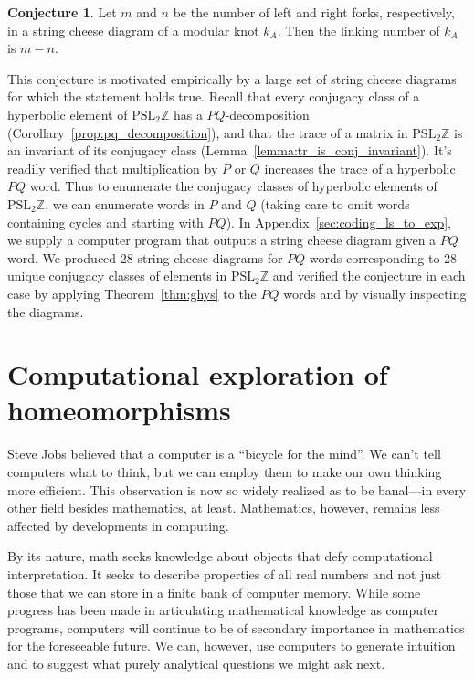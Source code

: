 \documentclass[12pt,twoside]{reedthesis}
\theoremstyle{definition}
\newtheorem{conj}[thm]{Conjecture}
\newcommand{\Z}{\mathbb{Z}}
\newcommand{\PSLZ}{\mathrm{PSL}_2{\Z}}
\begin{document}
\begin{conj}
  Let $m$ and $n$ be the number of left and right forks, respectively, in a string cheese diagram of a modular knot $k_A$.
  Then the linking number of $k_A$ is $m - n$.
\end{conj}

This conjecture is motivated empirically by a large set of string cheese diagrams for which the statement holds true.
Recall that every conjugacy class of a hyperbolic element of $\PSLZ$ has a $PQ$-decomposition (Corollary~\ref{prop:pq_decomposition}), and that the trace of a matrix in $\PSLZ$ is an invariant of its conjugacy class (Lemma~\ref{lemma:tr_is_conj_invariant}).
It's readily verified that multiplication by $P$ or $Q$ increases the trace of a hyperbolic $PQ$ word.
Thus to enumerate the conjugacy classes of hyperbolic elements of $\PSLZ$, we can enumerate words in $P$ and $Q$ (taking care to omit words containing cycles and starting with $PQ$).
In Appendix~\ref{sec:coding_ls_to_exp}, we supply a computer program that outputs a string cheese diagram given a $PQ$ word.
We produced 28 string cheese diagrams for $PQ$ words corresponding to 28 unique conjugacy classes of elements in $\PSLZ$ and verified the conjecture in each case  by applying Theorem~\ref{thm:ghys} to the $PQ$ words and by visually inspecting the diagrams.

\newpage
\appendix

\chapter{Computational exploration of homeomorphisms}

Steve Jobs believed that a computer is a ``bicycle for the mind''\cite{krainin1990}.
We can't tell computers what to think, but we can employ them to make our own thinking more efficient.
This observation is now so widely realized as to be banal---in every other field besides mathematics, at least.
Mathematics, however, remains less affected by developments in computing.

By its nature, math seeks knowledge about objects that defy computational interpretation.
It seeks to describe properties of all real numbers and not just those that we can store in a finite bank of computer memory.
While some progress has been made in articulating mathematical knowledge as computer programs, computers will continue to be of secondary importance in mathematics for the foreseeable future.
We can, however, use computers to generate intuition and to suggest what purely analytical questions we might ask next.
\end{document}
